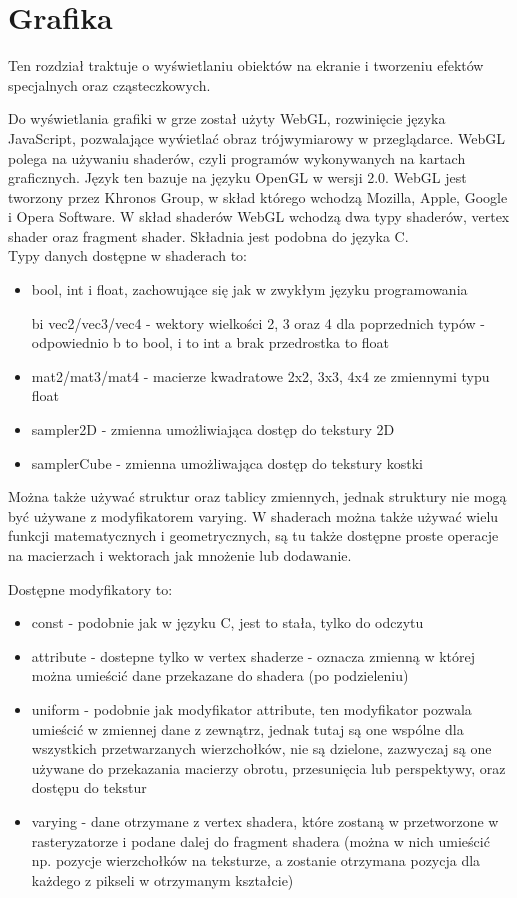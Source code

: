 \chapter{Grafika}
\thispagestyle{chapterBeginStyle}
\label{chapter_graphics}

Ten rozdział traktuje o wy\'swietlaniu obiektów na ekranie i tworzeniu efektów specjalnych oraz cząsteczkowych.

Do wy\'swietlania grafiki w grze został użyty WebGL, rozwinięcie języka JavaScript, pozwalające wy\'wietlać obraz trójwymiarowy w przeglądarce. WebGL polega na używaniu shaderów, czyli programów wykonywanych na kartach graficznych. Język ten bazuje na języku OpenGL w wersji 2.0. WebGL jest tworzony przez Khronos Group, w skład którego wchodzą Mozilla, Apple, Google i Opera Software. W skład shaderów WebGL wchodzą dwa typy shaderów, vertex shader oraz fragment shader. Składnia jest podobna do języka C.\\
Typy danych dostępne w shaderach to:\begin{itemize}[topsep=0.2em, itemsep=0.5em, partopsep=0em, parsep=0em]
	\item bool, int i float, zachowujące się jak w zwykłym języku programowania
	\item [bi]vec2/vec3/vec4 - wektory wielko\'sci 2, 3 oraz 4 dla poprzednich typów - odpowiednio b to bool, i to int a brak przedrostka to float
	\item mat2/mat3/mat4 - macierze kwadratowe 2x2, 3x3, 4x4 ze zmiennymi typu float
	\item sampler2D - zmienna umożliwiająca dostęp do tekstury 2D
	\item samplerCube - zmienna umożliwająca dostęp do tekstury kostki
\end{itemize}
Można także używać struktur oraz tablicy zmiennych, jednak struktury nie mogą być używane z modyfikatorem varying. W shaderach można także używać wielu funkcji matematycznych i geometrycznych, są tu także dostępne proste operacje na macierzach i wektorach jak mnożenie lub dodawanie.

Dostępne modyfikatory to:\begin{itemize}[topsep=0.2em, itemsep=0.5em, partopsep=0em, parsep=0em]
	\item const - podobnie jak w języku C, jest to stała, tylko do odczytu
	\item attribute - dostepne tylko w vertex shaderze - oznacza zmienną w której można umie\'scić dane przekazane do shadera (po podzieleniu)
	\item uniform - podobnie jak modyfikator attribute, ten modyfikator pozwala umie\'scić w zmiennej dane z zewnątrz, jednak tutaj są one wspólne dla wszystkich przetwarzanych wierzchołków, nie są dzielone, zazwyczaj są one używane do przekazania macierzy obrotu, przesunięcia lub perspektywy, oraz dostępu do tekstur
	\item varying - dane otrzymane z vertex shadera, które zostaną w przetworzone w rasteryzatorze i podane dalej do fragment shadera (można w nich umie\'scić np. pozycje wierzchołków na teksturze, a zostanie otrzymana pozycja dla każdego z pikseli w otrzymanym kształcie)
\end{itemize}

